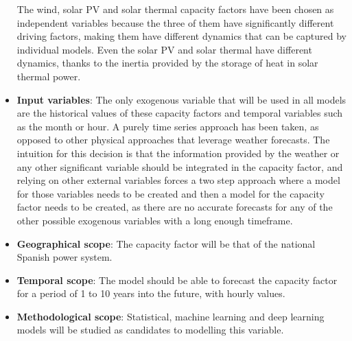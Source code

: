 \begin{itemize}
    The wind, solar PV and solar thermal capacity factors have been chosen as independent variables because the three of them have significantly different driving factors, making them have different dynamics that can be captured by individual models. Even the solar PV and solar thermal have different dynamics, thanks to the inertia provided by the storage of heat in solar thermal power. 
    \item \textbf{Input variables}: The only exogenous variable that will be used in all models are the historical values of these capacity factors and temporal variables such as the month or hour. A purely time series approach has been taken, as opposed to other physical approaches that leverage weather forecasts. The intuition for this decision is that the information provided by the weather or any other significant variable should be integrated in the capacity factor, and relying on other external variables forces a two step approach where a model for those variables needs to be created and then a model for the capacity factor needs to be created, as there are no accurate forecasts for any of the other possible exogenous variables with a long enough timeframe. 
    \item \textbf{Geographical scope}: The capacity factor will be that of the national Spanish power system. 
    \item \textbf{Temporal scope}: The model should be able to forecast the capacity factor for a period of 1 to 10 years into the future, with hourly values. 
    \item \textbf{Methodological scope}: Statistical, machine learning and deep learning models will be studied as candidates to modelling this variable. 
\end{itemize}

